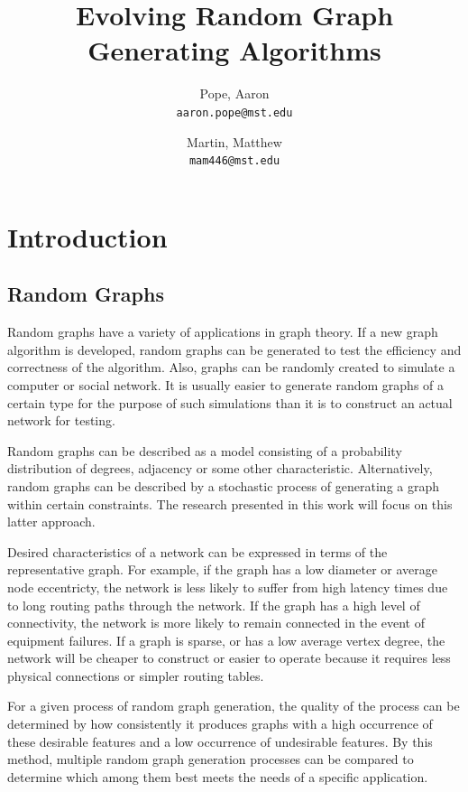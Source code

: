 \documentclass{article}
\begin{document}
\title{Evolving Random Graph Generating Algorithms}

\author{
Pope, Aaron\\
\texttt{aaron.pope@mst.edu}
\and
Martin, Matthew\\
\texttt{mam446@mst.edu}
}

\maketitle

\section{Introduction}

\subsection{Random Graphs}

Random graphs have a variety of applications in graph theory. If a new graph algorithm is
developed, random graphs can be generated to test the efficiency and correctness of the
algorithm. Also, graphs can be randomly created to simulate a computer or social network.
It is usually easier to generate random graphs of a certain type for the purpose of such
simulations than it is to construct an actual network for testing.

Random graphs can be
described as a model consisting of a probability distribution of degrees, adjacency or some other
characteristic. Alternatively, random graphs can be described by a stochastic process of
generating a graph within certain constraints. The research presented in this work will focus
on this latter approach.

Desired characteristics of a network can be expressed in terms of the representative graph. For
example, if the graph has a low diameter or average node eccentricty, the network is less likely
to suffer from high latency times due to long routing paths through the network. If the graph
has a high level of connectivity, the network is more likely to remain connected in the event of
equipment failures. If a graph is sparse, or has a low average vertex degree, the network will
be cheaper to construct or easier to operate because it requires less physical connections or
simpler routing tables.

For a given process of random graph generation, the quality of the process can be determined
by how consistently it produces graphs with a high occurrence of these desirable features and
a low occurrence of undesirable features. By this method, multiple random graph generation
processes can be compared to determine which among them best meets the needs of a specific
application.
\end{document}
